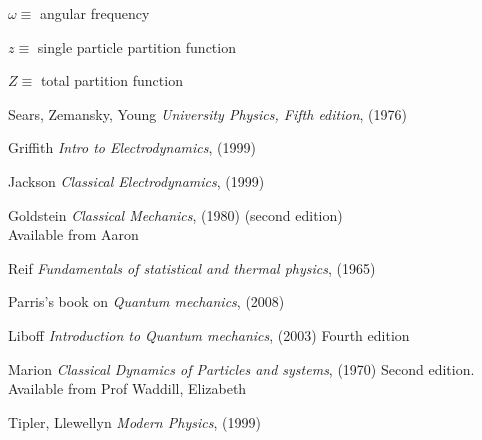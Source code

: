 \documentclass[12pt]{article}  %
\begin{document}
$\omega \equiv$ angular frequency

$z \equiv$ single particle partition function

$Z \equiv$ total partition function

\begin{thebibliography}{99}

Sears, Zemansky, Young \textit{University Physics, Fifth edition}, (1976)

Griffith \textit{Intro to Electrodynamics}, (1999)

Jackson \textit{Classical Electrodynamics}, (1999)

Goldstein \textit{Classical Mechanics}, (1980) (second edition)\\
Available from Aaron

Reif \textit{Fundamentals of statistical and thermal physics}, (1965)

Parris's book on \textit{Quantum mechanics}, (2008) \\

Liboff \textit{Introduction to Quantum mechanics}, (2003) Fourth edition

Marion \textit{Classical Dynamics of Particles and systems}, (1970) Second edition. \\
Available from Prof Waddill, Elizabeth

Tipler, Llewellyn \textit{Modern Physics}, (1999)

\end{thebibliography}
\end{document}

